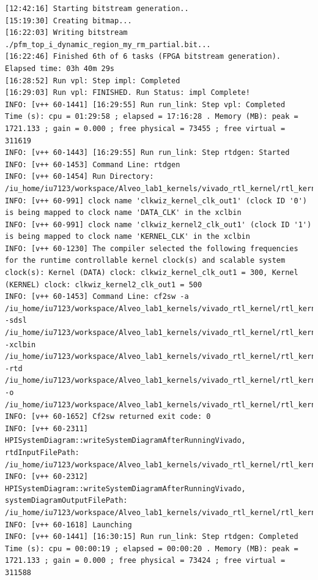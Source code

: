 \begin{lstlisting}
[12:42:16] Starting bitstream generation..
[15:19:30] Creating bitmap...
[16:22:03] Writing bitstream ./pfm_top_i_dynamic_region_my_rm_partial.bit...
[16:22:46] Finished 6th of 6 tasks (FPGA bitstream generation). Elapsed time: 03h 40m 29s 
[16:28:52] Run vpl: Step impl: Completed
[16:29:03] Run vpl: FINISHED. Run Status: impl Complete!
INFO: [v++ 60-1441] [16:29:55] Run run_link: Step vpl: Completed
Time (s): cpu = 01:29:58 ; elapsed = 17:16:28 . Memory (MB): peak = 1721.133 ; gain = 0.000 ; free physical = 73455 ; free virtual = 311619
INFO: [v++ 60-1443] [16:29:55] Run run_link: Step rtdgen: Started
INFO: [v++ 60-1453] Command Line: rtdgen
INFO: [v++ 60-1454] Run Directory: /iu_home/iu7123/workspace/Alveo_lab1_kernels/vivado_rtl_kernel/rtl_kernel_wizard_2_ex/exports/_x/link/run_link
INFO: [v++ 60-991] clock name 'clkwiz_kernel_clk_out1' (clock ID '0') is being mapped to clock name 'DATA_CLK' in the xclbin
INFO: [v++ 60-991] clock name 'clkwiz_kernel2_clk_out1' (clock ID '1') is being mapped to clock name 'KERNEL_CLK' in the xclbin
INFO: [v++ 60-1230] The compiler selected the following frequencies for the runtime controllable kernel clock(s) and scalable system clock(s): Kernel (DATA) clock: clkwiz_kernel_clk_out1 = 300, Kernel (KERNEL) clock: clkwiz_kernel2_clk_out1 = 500
INFO: [v++ 60-1453] Command Line: cf2sw -a /iu_home/iu7123/workspace/Alveo_lab1_kernels/vivado_rtl_kernel/rtl_kernel_wizard_2_ex/exports/_x/link/int/address_map.xml -sdsl /iu_home/iu7123/workspace/Alveo_lab1_kernels/vivado_rtl_kernel/rtl_kernel_wizard_2_ex/exports/_x/link/int/sdsl.dat -xclbin /iu_home/iu7123/workspace/Alveo_lab1_kernels/vivado_rtl_kernel/rtl_kernel_wizard_2_ex/exports/_x/link/int/xclbin_orig.xml -rtd /iu_home/iu7123/workspace/Alveo_lab1_kernels/vivado_rtl_kernel/rtl_kernel_wizard_2_ex/exports/_x/link/int/vinc.rtd -o /iu_home/iu7123/workspace/Alveo_lab1_kernels/vivado_rtl_kernel/rtl_kernel_wizard_2_ex/exports/_x/link/int/vinc.xml
INFO: [v++ 60-1652] Cf2sw returned exit code: 0
INFO: [v++ 60-2311] HPISystemDiagram::writeSystemDiagramAfterRunningVivado, rtdInputFilePath: /iu_home/iu7123/workspace/Alveo_lab1_kernels/vivado_rtl_kernel/rtl_kernel_wizard_2_ex/exports/_x/link/int/vinc.rtd
INFO: [v++ 60-2312] HPISystemDiagram::writeSystemDiagramAfterRunningVivado, systemDiagramOutputFilePath: /iu_home/iu7123/workspace/Alveo_lab1_kernels/vivado_rtl_kernel/rtl_kernel_wizard_2_ex/exports/_x/link/int/systemDiagramModelSlrBaseAddress.json
INFO: [v++ 60-1618] Launching 
INFO: [v++ 60-1441] [16:30:15] Run run_link: Step rtdgen: Completed
Time (s): cpu = 00:00:19 ; elapsed = 00:00:20 . Memory (MB): peak = 1721.133 ; gain = 0.000 ; free physical = 73424 ; free virtual = 311588

\end{lstlisting}
